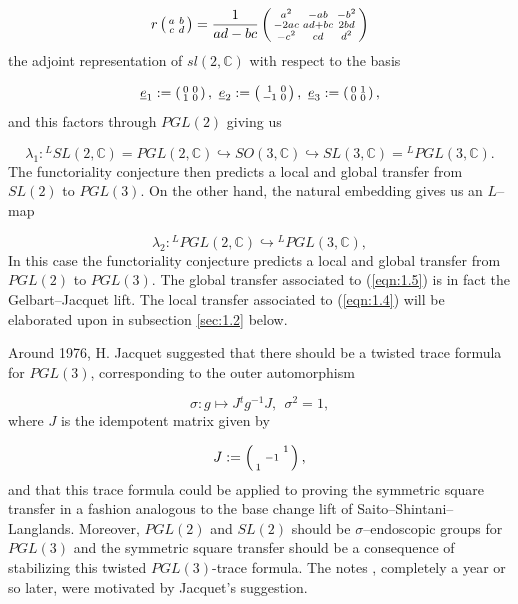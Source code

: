 \documentclass[12pt,letterpaper]{article}
\def\ccc{\mathbb{C}}
\begin{document}
\begin{equation}
\label{eqn:1.3}
r\left(\smallmatrix a&b \\ c&d \endsmallmatrix\right)
= {1\over{ad-bc}}\left(\smallmatrix a^2&-ab&-b^2 \\
-2ac&ad+bc&2bd\\
-c^2&cd&d^2 \endsmallmatrix\right)
\end{equation}
the adjoint representation of $sl(2,\ccc )$ with respect to the basis

\[
\underline{e}_1 := \left(\smallmatrix 0&0 \\ 1&0 \endsmallmatrix\right),
\ \underline{e}_2 := \left(\smallmatrix 1&0 \\ -1&0 \endsmallmatrix\right),
\ \underline{e}_3 := \left(\smallmatrix 0&1 \\ 0&0 \endsmallmatrix\right),
\]
and this factors through $PGL(2)$ giving us

\begin{equation}
\label{eqn:1.4}
\lambda_1 :  {^{L}SL(2,\ccc )} =PGL(2,\ccc )
\hookrightarrow SO(3,\ccc ) 
\hookrightarrow  SL(3,\ccc ) = {^{L}PGL(3,\ccc )} .
\end{equation}
The functoriality conjecture then predicts a local and global transfer
from $SL(2)$ to $PGL(3)$. On the other hand, the natural embedding gives us
an $L$--map

\begin{equation}
\label{eqn:1.5}
\lambda_2 : {^{L}PGL(2,\ccc )} \hookrightarrow {^{L}PGL(3,\ccc )},
\end{equation}
In this case the functoriality conjecture predicts a local and global
transfer from $PGL(2)$ to $PGL(3)$. The global transfer associated to 
(\ref{eqn:1.5}) 
is in fact the Gelbart--Jacquet lift. The local transfer associated to
(\ref{eqn:1.4}) will be elaborated upon in subsection 
\ref{sec:1.2} below.
 
Around 1976, H. Jacquet suggested that there should be a twisted trace
formula for $PGL(3)$, corresponding to the outer automorphism

\[
\sigma : g \longmapsto J{^{t}g^{-1}}J,\ \ \sigma^2 = 1,
\]
where $J$ is the idempotent matrix given by

\[
J:= \left(\smallmatrix \ &\ &1\\
\ &-1&\ \\
1&\ &\ \endsmallmatrix\right),
\]
and that this trace formula could be applied to proving the symmetric square 
transfer in a fashion analogous to the base change lift of 
Saito--Shintani--Langlands.  Moreover,
$PGL(2)$ and $SL(2)$ should be $\sigma$--endoscopic groups for $PGL(3)$ and the
symmetric square transfer should be a consequence of stabilizing this twisted
$PGL(3)$-trace formula. The notes \cite{La1}, completely a year or so later,
were motivated by Jacquet's suggestion.
\end{document}
